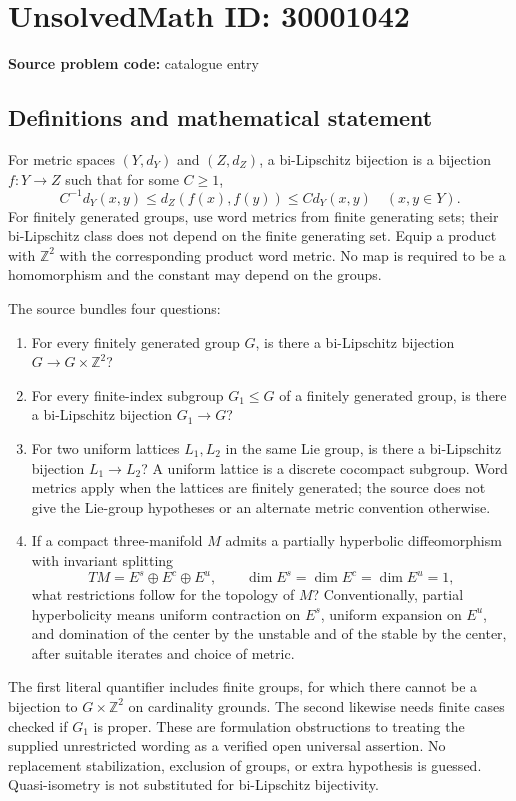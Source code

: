 \documentclass[11pt]{article}
\newcommand{\Z}{\mathbb{Z}}
\begin{document}
\section*{UnsolvedMath ID: 30001042}
\textbf{Source problem code:} catalogue entry
\subsection{Definitions and mathematical statement}
For metric spaces $(Y,d_Y)$ and $(Z,d_Z)$, a bi-Lipschitz bijection is a bijection $f:Y\to Z$ such that for some $C\geq1$,
\[
C^{-1}d_Y(x,y)\leq d_Z(f(x),f(y))\leq C d_Y(x,y)\quad(x,y\in Y).
\]
For finitely generated groups, use word metrics from finite generating sets; their bi-Lipschitz class does not depend on the finite generating set. Equip a product with $\Z^2$ with the corresponding product word metric. No map is required to be a homomorphism and the constant may depend on the groups.

The source bundles four questions:
\begin{enumerate}
\item For every finitely generated group $G$, is there a bi-Lipschitz bijection $G\to G\times\Z^2$?
\item For every finite-index subgroup $G_1\leq G$ of a finitely generated group, is there a bi-Lipschitz bijection $G_1\to G$?
\item For two uniform lattices $L_1,L_2$ in the same Lie group, is there a bi-Lipschitz bijection $L_1\to L_2$? A uniform lattice is a discrete cocompact subgroup. Word metrics apply when the lattices are finitely generated; the source does not give the Lie-group hypotheses or an alternate metric convention otherwise.
\item If a compact three-manifold $M$ admits a partially hyperbolic diffeomorphism with invariant splitting
\[
TM=E^s\oplus E^c\oplus E^u,\qquad
\dim E^s=\dim E^c=\dim E^u=1,
\]
what restrictions follow for the topology of $M$? Conventionally, partial hyperbolicity means uniform contraction on $E^s$, uniform expansion on $E^u$, and domination of the center by the unstable and of the stable by the center, after suitable iterates and choice of metric.
\end{enumerate}
The first literal quantifier includes finite groups, for which there cannot be a bijection to $G\times\Z^2$ on cardinality grounds. The second likewise needs finite cases checked if $G_1$ is proper. These are formulation obstructions to treating the supplied unrestricted wording as a verified open universal assertion. No replacement stabilization, exclusion of groups, or extra hypothesis is guessed. Quasi-isometry is not substituted for bi-Lipschitz bijectivity.
\end{document}
